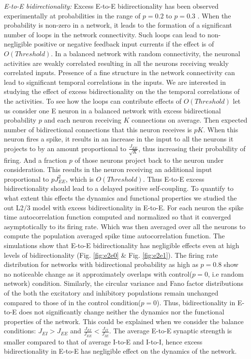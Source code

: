 \emph{E-to-E bidirectionality:} Excess E-to-E bidirectionality has been observed experimentally at probabilities in the range of $p = 0.2$ to $p = 0.3$ \cite{Song2005}. When the probability is non-zero in a network, it leads to the formation of a significant number of loops in the network connectivity. Such loops can lead to non-negligible positive or negative feedback input currents if the effect is of $O(Threshold)$. In a balanced network with random connectivity, the neuronal activities are weakly correlated resulting in all the neurons receiving weakly correlated inputs. Presence of a fine structure in the network connectivity can lead to significant temporal correlations in the inputs. We are interested in studying the effect of excess bidirectionality on the the temporal correlations of the activities. To see how the loops can contribute effects of $O(Threshold)$ let us consider one E neuron in a balanced network with excess bidirectional probability $p$ and each neuron receiving $K$ connections on average. Then expected number of bidirectional connections that this neuron receives is $pK$. When this neuron fires a spike, it results in an increase in the input to all the neurons it projects to by an amount proportional to $\frac{J_{EE}}{\sqrt{K}}$, thus increasing their probability of firing. And a fraction $p$ of those neurons project back to the neuron under consideration. This results in the neuron receiving an additional input proportional to $p J_{EE}^{2}$, which is $O(Threshold)$. Thus E-to-E excess bidirectionality should lead to a delayed positive self-coupling. To quantify to what extent this effects the dynamics and functional properties we studied the out L2/3 model with excess bidirectionality in E-to-E. For each neuron the spike time autocorrelation function computed and normalized so that it converged asymptotically to its firing rate. Which was then averaged over all the neurons  to compute the population averaged spike time autocorrelation function. The simulations show that E-to-E bidirectionality has negligible effects even at high levels of bidirectionality (Fig. \ref{fig:e2e0} \& Fig. \ref{fig:e2e1}). The firing rate distribution for networks with bidirectional probability as high as $p = 0.8$ show no noticeable change as it approximately overlaps with control($p = 0$, i.e random network) condition. Similarly, the circular variance and Fano factor distributions of the both the excitatory and inhibitory populations remain unchanged compared to those of in the control condition($p=0$). Thus, bidirectionality in E-to-E does not significantly change neither the dynamics nor the functional properties of the network. This could be explained when we consider the balance conditions: $J_{EI} > J_{EE}$ and $\frac{J_{EI}}{J_{EE}} < \frac{J_{II}}{J_{IE}}$. The average E-to-E synaptic strength is smaller compared to that of average I-to-E and I-to-I, hence excess bidirectionality in E-to-E has negligible effect on the dynamics of the network. \\

